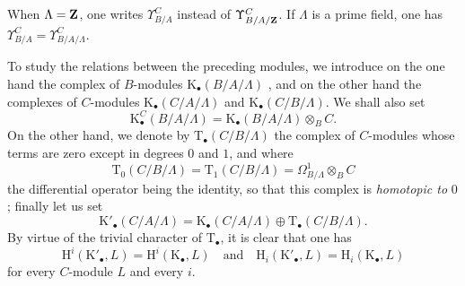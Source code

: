 \begin{env}[20.6.14]
When $\Lambda=\mathbf{Z}$, one writes $\Upsilon^C_{B/A}$ instead of $\Upsilon^C_{B/A/\mathbf{Z}}$.
If $\Lambda$ is a prime field, one has $\Upsilon^C_{B/A}=\Upsilon^C_{B/A/\Lambda}$.
\end{env}

\begin{env}[20.6.15]
\label{0.20.6.15}
To study the relations between the preceding modules, we introduce on the one hand the complex of $B$-modules $\mathrm{K}_\bullet(B/A/\Lambda)$ , and on the other hand the complexes
of $C$-modules $\mathrm{K}_\bullet(C/A/\Lambda)$ and $\mathrm{K}_\bullet(C/B/\Lambda)$.
We shall also set
\begin{equation}
\tag{20.6.15.1}
  \label{0.20.6.15.1}
  \mathrm{K}^C_\bullet(B/A/\Lambda)=\mathrm{K}_\bullet(B/A/\Lambda)\otimes_B C.
\end{equation}
On the other hand, we denote by $\mathrm{T}_\bullet(C/B/\Lambda)$ the complex of $C$-modules whose terms are zero except in degrees $0$ and $1$, and where
\begin{equation}
\tag{20.6.15.2}
  \label{0.20.6.15.2}
  \mathrm{T}_0(C/B/\Lambda)=\mathrm{T}_1(C/B/\Lambda)=\Omega^1_{B/\Lambda}\otimes_B C
\end{equation}
the differential operator being the identity, so that this complex is \emph{homotopic to} $0$; finally let us set
\begin{equation}
\tag{20.6.15.3}
  \label{0.20.6.15.3}
  \mathrm{K}'_\bullet(C/A/\Lambda)=\mathrm{K}_\bullet(C/A/\Lambda)\oplus\mathrm{T}_\bullet(C/B/\Lambda).
\end{equation}
By virtue of the trivial character of $\mathrm{T}_\bullet$, it is clear that one has
\begin{equation}
\tag{20.6.15.4}
  \label{0.20.6.15.4}
  \mathrm{H}^i(\mathrm{K}'_\bullet,L)=\mathrm{H}^i(\mathrm{K}_\bullet,L)\quad\text{and}\quad\mathrm{H}_i(\mathrm{K}'_\bullet,L)=\mathrm{H}_i(\mathrm{K}_\bullet,L)
\end{equation}
for every $C$-module $L$ and every $i$.
\end{env}

